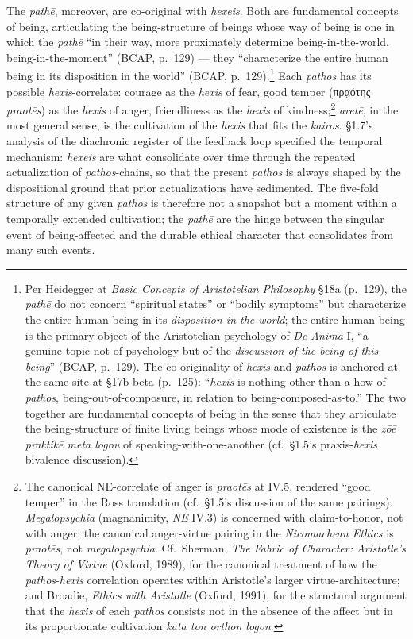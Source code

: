 \documentclass{article}
\newcommand{\gk}[1]{{\greekfont #1}}
\begin{document}
The \textit{pathē}, moreover, are co-original with \textit{hexeis}. Both are fundamental concepts of being, articulating the being-structure of beings whose way of being is one in which the \textit{pathē} ``in their way, more proximately determine being-in-the-world, being-in-the-moment'' (BCAP, p.~129) --- they ``characterize the entire human being in its disposition in the world'' (BCAP, p.~129).\footnote{Per Heidegger at \textit{Basic Concepts of Aristotelian Philosophy} \S 18a (p.~129), the \textit{pathē} do not concern ``spiritual states'' or ``bodily symptoms'' but characterize the entire human being in its \textit{disposition in the world}; the entire human being is the primary object of the Aristotelian psychology of \textit{De Anima} I, ``a genuine topic not of psychology but of the \textit{discussion of the being of this being}'' (BCAP, p.~129). The co-originality of \textit{hexis} and \textit{pathos} is anchored at the same site at \S 17b-beta (p.~125): ``\textit{hexis} is nothing other than a how of \textit{pathos}, being-out-of-composure, in relation to being-composed-as-to.'' The two together are fundamental concepts of being in the sense that they articulate the being-structure of finite living beings whose mode of existence is the \textit{zō\=e praktik\=e meta logou} of speaking-with-one-another (cf.~\S 1.5's praxis-\textit{hexis} bivalence discussion).} Each \textit{pathos} has its possible \textit{hexis}-correlate: courage as the \textit{hexis} of fear, good temper (\gk{πρᾳότης} \textit{praot\=es}) as the \textit{hexis} of anger, friendliness as the \textit{hexis} of kindness;\footnote{The canonical NE-correlate of anger is \textit{praot\=es} at IV.5, rendered ``good temper'' in the Ross translation (cf.~\S 1.5's discussion of the same pairings). \textit{Megalopsychia} (magnanimity, \textit{NE} IV.3) is concerned with claim-to-honor, not with anger; the canonical anger-virtue pairing in the \textit{Nicomachean Ethics} is \textit{praot\=es}, not \textit{megalopsychia}. Cf.~Sherman, \textit{The Fabric of Character: Aristotle's Theory of Virtue} (Oxford, 1989), for the canonical treatment of how the \textit{pathos}-\textit{hexis} correlation operates within Aristotle's larger virtue-architecture; and Broadie, \textit{Ethics with Aristotle} (Oxford, 1991), for the structural argument that the \textit{hexis} of each \textit{pathos} consists not in the absence of the affect but in its proportionate cultivation \textit{kata ton orthon logon}.} \textit{aretē}, in the most general sense, is the cultivation of the \textit{hexis} that fits the \textit{kairos}. \S1.7's analysis of the diachronic register of the feedback loop specified the temporal mechanism: \textit{hexeis} are what consolidate over time through the repeated actualization of \textit{pathos}-chains, so that the present \textit{pathos} is always shaped by the dispositional ground that prior actualizations have sedimented. The five-fold structure of any given \textit{pathos} is therefore not a snapshot but a moment within a temporally extended cultivation; the \textit{pathē} are the hinge between the singular event of being-affected and the durable ethical character that consolidates from many such events.
\end{document}
